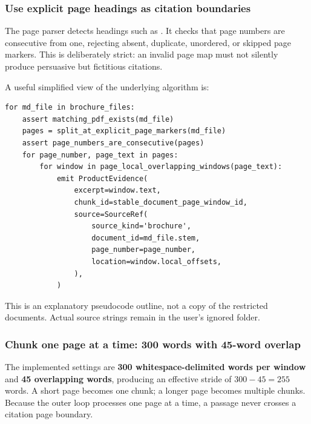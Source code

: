 \documentclass[11pt,a4paper]{article}
\DeclareRobustCommand{\code}[1]{{\ttfamily\small\detokenize{#1}}}
\begin{document}
\subsubsection{Use explicit page headings as citation boundaries}
The page parser detects headings such as \code{#### Page 2}. It checks that page numbers are consecutive from one, rejecting absent, duplicate, unordered, or skipped page markers. This is deliberately strict: an invalid page map must not silently produce persuasive but fictitious citations.

A useful simplified view of the underlying algorithm is:
\begin{Verbatim}[fontsize=\footnotesize]
for md_file in brochure_files:
    assert matching_pdf_exists(md_file)
    pages = split_at_explicit_page_markers(md_file)
    assert page_numbers_are_consecutive(pages)
    for page_number, page_text in pages:
        for window in page_local_overlapping_windows(page_text):
            emit ProductEvidence(
                excerpt=window.text,
                chunk_id=stable_document_page_window_id,
                source=SourceRef(
                    source_kind='brochure',
                    document_id=md_file.stem,
                    page_number=page_number,
                    location=window.local_offsets,
                ),
            )
\end{Verbatim}

This is an explanatory pseudocode outline, not a copy of the restricted documents. Actual source strings remain in the user's ignored \code{raw/} folder.

\subsubsection{Chunk one page at a time: 300 words with 45-word overlap}
The implemented settings are \textbf{300 whitespace-delimited words per window} and \textbf{45 overlapping words}, producing an effective stride of \(300-45=255\) words. A short page becomes one chunk; a longer page becomes multiple chunks. Because the outer loop processes one page at a time, a passage never crosses a citation page boundary.

\begin{center}
\end{center}
\end{document}
